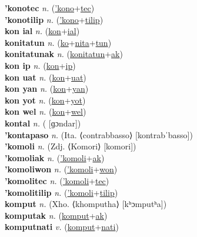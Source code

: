 \textbf{'konotec} \textit{n.} (\hyperref['kono]{'kono}+\hyperref[tec]{tec})
 \label{'konotec} \\
\textbf{'konotilip} \textit{n.} (\hyperref['kono]{'kono}+\hyperref[tilip]{tilip})
 \label{'konotilip} \\
\textbf{kon ial} \textit{n.} (\hyperref[kon]{kon}+\hyperref[ial]{ial})
 \label{kon ial} \\
\textbf{konitatun} \textit{n.} (\hyperref[ko]{ko}+\hyperref[nita]{nita}+\hyperref[tun]{tun})
 \label{konitatun} \\
\textbf{konitatunak} \textit{n.} (\hyperref[konitatun]{konitatun}+\hyperref[ak]{ak})
 \label{konitatunak} \\
\textbf{kon ip} \textit{n.} (\hyperref[kon]{kon}+\hyperref[ip]{ip})
 \label{kon ip} \\
\textbf{kon uat} \textit{n.} (\hyperref[kon]{kon}+\hyperref[uat]{uat})
 \label{kon uat} \\
\textbf{kon yan} \textit{n.} (\hyperref[kon]{kon}+\hyperref[yan]{yan})
 \label{kon yan} \\
\textbf{kon yot} \textit{n.} (\hyperref[kon]{kon}+\hyperref[yot]{yot})
 \label{kon yot} \\
\textbf{kon wel} \textit{n.} (\hyperref[kon]{kon}+\hyperref[wel]{wel})
 \label{kon wel} \\
\textbf{kontal} \textit{n.} ( [ɡɔndar])
 \label{kontal} \\
\textbf{'kontapaso} \textit{n.} (Ita. ⟨contrabbasso⟩ [kontrabˈbasso])
 \label{'kontapaso} \\
\textbf{'komoli} \textit{n.} (Zdj. ⟨Komori⟩ [komori])
 \label{'komoli} \\
\textbf{'komoliak} \textit{n.} (\hyperref['komoli]{'komoli}+\hyperref[ak]{ak})
 \label{'komoliak} \\
\textbf{'komoliwon} \textit{n.} (\hyperref['komoli]{'komoli}+\hyperref[won]{won})
 \label{'komoliwon} \\
\textbf{'komolitec} \textit{n.} (\hyperref['komoli]{'komoli}+\hyperref[tec]{tec})
 \label{'komolitec} \\
\textbf{'komolitilip} \textit{n.} (\hyperref['komoli]{'komoli}+\hyperref[tilip]{tilip})
 \label{'komolitilip} \\
\textbf{komput} \textit{n.} (Xho. ⟨khomputha⟩ [kʰɔmputʰa])
 \label{komput} \\
\textbf{komputak} \textit{n.} (\hyperref[komput]{komput}+\hyperref[ak]{ak})
 \label{komputak} \\
\textbf{komputnati} \textit{v.} (\hyperref[komput]{komput}+\hyperref[nati]{nati})
